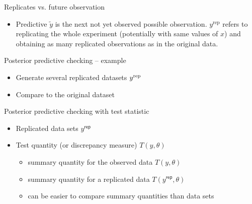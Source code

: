 \documentclass[aspectratio=169]{beamer}
\begin{document}
\begin{frame}{Replicates vs. future observation}

  \begin{itemize}
  \item Predictive $\tilde{y}$ is the next not yet observed possible
    observation. $y^{\mathrm{rep}}$ refers to replicating the whole
    experiment (potentially with same values of $x$) and obtaining as
    many replicated observations as in the original data.
  \end{itemize}

\end{frame}

\begin{frame}[fragile]{Posterior predictive checking -- example}

  \begin{itemize}
  \item<1-> Generate several replicated datasets $y^{\rm rep}$
  \item<2-> Compare to the original dataset
  \end{itemize}
  \vspace{-1\baselineskip}

\end{frame}


\begin{frame}{Posterior predictive checking with test statistic}

  \begin{itemize}
  \item Replicated data sets $y^{\mathsf{rep}}$
  \item Test quantity (or discrepancy measure) $T(y,\theta)$
    \begin{itemize}
    \item summary quantity for the observed data $T(y,\theta)$
    \item summary quantity for a replicated data $T(y^{\mathsf{rep}},\theta)$
    \item can be easier to compare summary quantities than data sets
    \end{itemize}
  \end{itemize}

\end{frame}
\end{document}

